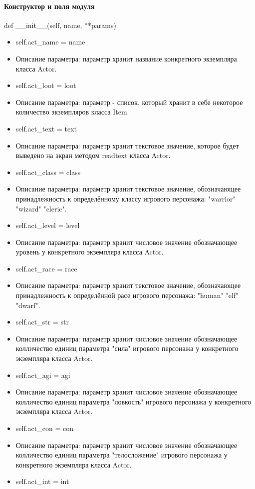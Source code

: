 \paragraph{Конструктор и поля модуля}
def \_\_init\_\_(self, name, **params)
\begin{itemize}
	\item self.act\_name = name 
	\item Описание параметра: параметр хранит название конкретного экземпляра класса Actor.
	\item self.act\_loot = loot 
	\item Описание параметра: параметр - список, который хранит в себе некоторое количество экземпляров класса Item.
	\item self.act\_text = text 
	\item Описание параметра: параметр хранит текстовое значение, которое будет выведено на экран методом readtext класса Actor.
	\item self.act\_class = class 
	\item Описание параметра: параметр хранит текстовое значение, обозначающее принадлежность к определённому классу игрового персонажа: "warrior" "wizard" "cleric".
	\item self.act\_level = level 
	\item Описание параметра: параметр хранит числовое значение обозначающее уровень у конкретного экземпляра класса Actor.
	\item self.act\_race = race 
	\item Описание параметра: параметр хранит текстовое значение, обозначающее принадлежность к определённой расе игрового персонажа: "human" "elf" "dwarf".
	\item self.act\_str = str 
	\item Описание параметра: параметр хранит числовое значение обозначающее колличество единиц параметра "сила" игрового персонажа у конкретного экземпляра класса Actor.
	\item self.act\_agi = agi 
	\item Описание параметра: параметр хранит числовое значение обозначающее колличество единиц параметра "ловкость" игрового персонажа у конкретного экземпляра класса Actor.
	\item self.act\_con = con 
	\item Описание параметра: параметр хранит числовое значение обозначающее колличество единиц параметра "телосложение" игрового персонажа у конкретного экземпляра класса Actor.
	\item self.act\_int = int 

\end{itemize}
